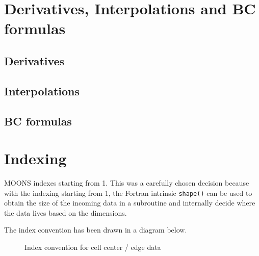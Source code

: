 \section{Derivatives, Interpolations and BC formulas}
\subsection{Derivatives}

\subsection{Interpolations}

\subsection{BC formulas}


\section{Indexing}

MOONS indexes starting from 1. This was a carefully chosen decision because with the indexing starting from 1, the Fortran intrinsic \lstinline$shape()$ can be used to obtain the size of the incoming data in a subroutine and internally decide where the data lives based on the dimensions.

The index convention has been drawn in a diagram below.
\begin{figure}[h!]
  \begin{center}
    \caption{Index convention for cell center / edge data}
  \end{center}
\end{figure}

